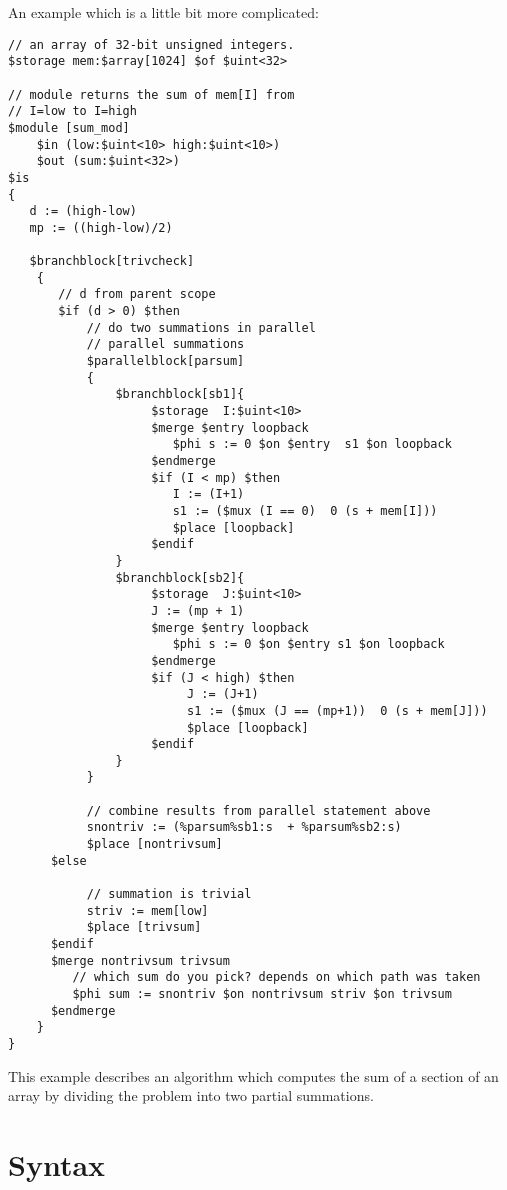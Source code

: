 \documentclass{article}
\begin{document}
An example which is a little bit more complicated:
\begin{verbatim}
// an array of 32-bit unsigned integers.
$storage mem:$array[1024] $of $uint<32>   

// module returns the sum of mem[I] from
// I=low to I=high
$module [sum_mod]
    $in (low:$uint<10> high:$uint<10>)
    $out (sum:$uint<32>)
$is
{
   d := (high-low)  
   mp := ((high-low)/2)

   $branchblock[trivcheck]
    {
       // d from parent scope
       $if (d > 0) $then  
           // do two summations in parallel
           // parallel summations
           $parallelblock[parsum]
           {
               $branchblock[sb1]{
                    $storage  I:$uint<10>
                    $merge $entry loopback
                       $phi s := 0 $on $entry  s1 $on loopback
                    $endmerge
                    $if (I < mp) $then
                       I := (I+1)
                       s1 := ($mux (I == 0)  0 (s + mem[I]))
                       $place [loopback]
                    $endif
               } 
               $branchblock[sb2]{
                    $storage  J:$uint<10>
                    J := (mp + 1)
                    $merge $entry loopback
                       $phi s := 0 $on $entry s1 $on loopback
                    $endmerge
                    $if (J < high) $then
                         J := (J+1)
                         s1 := ($mux (J == (mp+1))  0 (s + mem[J]))
                         $place [loopback]
                    $endif
               } 
           }
 
           // combine results from parallel statement above
           snontriv := (%parsum%sb1:s  + %parsum%sb2:s)
           $place [nontrivsum]
      $else

           // summation is trivial 
           striv := mem[low]
           $place [trivsum]
      $endif
      $merge nontrivsum trivsum
         // which sum do you pick? depends on which path was taken
         $phi sum := snontriv $on nontrivsum striv $on trivsum
      $endmerge
    }
}
\end{verbatim} 
This example describes an algorithm which computes the sum of
a section of an array by dividing the problem into two partial
summations. 

\section{Syntax} \label{sec:Syntax}
\end{document}
